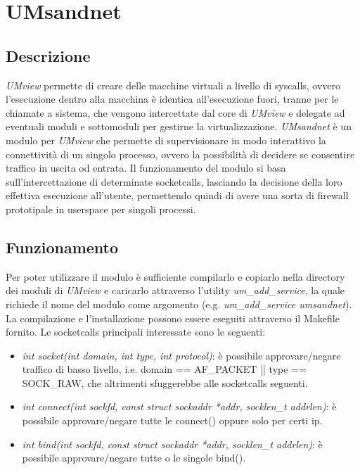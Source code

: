 \chapter{UMsandnet}
\section{Descrizione}
{\em UMview} permette di creare delle macchine virtuali a livello di syscalls, ovvero l'esecuzione dentro alla macchina è identica all'esecuzione fuori, tranne per le chiamate a sistema, che vengono intercettate dal core di {\em UMview} e delegate ad eventuali moduli e sottomoduli per gestirne la virtualizzazione.
{\em UMsandnet} è un modulo per {\em UMview} che permette di supervisionare in modo interattivo la connettività di un singolo processo, ovvero la possibilità di decidere se consentire traffico in uscita od entrata.
Il funzionamento del modulo si basa sull'intercettazione di determinate socketcalls, lasciando la decisione della loro effettiva esecuzione all'utente, permettendo quindi di avere una sorta di firewall prototipale in userspace per singoli processi.
\section{Funzionamento}
Per poter utilizzare il modulo è sufficiente compilarlo e copiarlo nella directory dei moduli di {\em UMview} e caricarlo attraverso l'utility {\em um\_add\_service}, la quale richiede il nome del modulo come argomento (e.g. {\em um\_add\_service umsandnet}). La compilazione e l'installazione possono essere eseguiti attraverso il Makefile fornito.
Le socketcalls principali interessate sono le seguenti:
\begin{itemize}
\item {\em int socket(int domain, int type, int protocol)}: è possibile approvare/negare traffico di basso livello, i.e. domain == AF\_PACKET || type == SOCK\_RAW, che altrimenti sfuggerebbe alle socketcalls seguenti.
\item {\em int connect(int sockfd, const struct sockaddr *addr, socklen\_t addrlen)}: è possibile approvare/negare tutte le connect() oppure solo per certi ip.
\item {\em int bind(int sockfd, const struct sockaddr *addr, socklen\_t addrlen)}: è possibile approvare/negare tutte o le singole bind().
\end{itemize}
